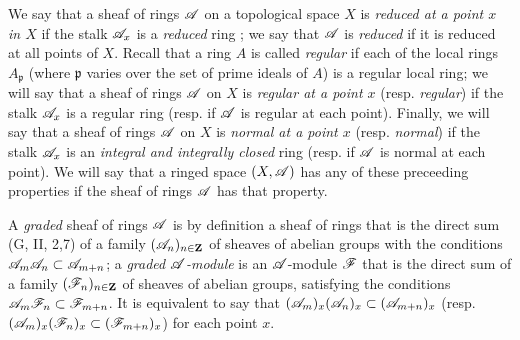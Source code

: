 \begin{env}[4.1.4]
\label{0.4.1.4}
We say that a sheaf of rings $\mathscr{A}$ on a topological space $X$ is
\emph{reduced at a point $x$ in $X$} if the stalk $\mathscr{A}_x$ is a \emph{reduced}
ring ; we say that $\mathscr{A}$ is \emph{reduced} if it is reduced
at all points of $X$. Recall that a ring $A$ is called \emph{regular} if each of
the local rings $A_\mathfrak{p}$ (where $\mathfrak{p}$ varies over the set of
prime ideals of $A$) is a regular local ring; we will say that a sheaf of rings
$\mathscr{A}$ on $X$ is \emph{regular at a point $x$} (resp. \emph{regular}) if the
stalk $\mathscr{A}_x$ is a regular ring (resp. if $\mathscr{A}$ is regular at each point).
Finally, we will say that a sheaf of rings $\mathscr{A}$ on $X$ is \emph{normal at a
point $x$} (resp. \emph{normal}) if the stalk $\mathscr{A}_x$ is an \emph{integral
and integrally closed} ring (resp. if $\mathscr{A}$ is normal at each point). We will
say that a ringed space $(X,\mathscr{A})$ has any of these preceeding properties if
the sheaf of rings $\mathscr{A}$ has that property.

A \emph{graded} sheaf of rings $\mathscr{A}$ is by definition a sheaf of rings that
is the direct sum (G, II, 2,7) of a family $(\mathscr{A}_n)_{n\in\mathbf{Z}}$ of sheaves
of abelian groups with the conditions $\mathscr{A}_m\mathscr{A}_n\subset\mathscr{A}_{m+n}$; a
\emph{graded $\mathscr{A}$-module} is an $\mathscr{A}$-module $\mathscr{F}$ that is the direct
sum of a family $(\mathscr{F}_n)_{n\in\mathbf{Z}}$ of sheaves of abelian groups,
satisfying the conditions $\mathscr{A}_m\mathscr{F}_n\subset\mathscr{F}_{m+n}$. It is
equivalent to say that $(\mathscr{A}_m)_x(\mathscr{A}_n)_x\subset(\mathscr{A}_{m+n})_x$
(resp. $(\mathscr{A}_m)_x(\mathscr{F}_n)_x\subset(\mathscr{F}_{m+n})_x$) for each point $x$.
\end{env}

